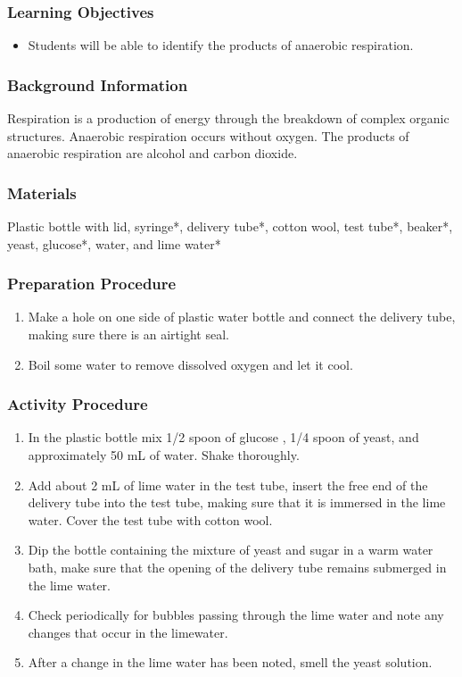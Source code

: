 \subsubsection*{Learning Objectives}
\begin{itemize}
\item{Students will be able to identify the products of anaerobic respiration.}
\end{itemize}

\subsubsection*{Background Information}
Respiration is a production of energy through the breakdown of complex organic structures. Anaerobic respiration occurs without oxygen. The products of anaerobic respiration are alcohol and carbon dioxide.

\subsubsection*{Materials}
Plastic bottle with lid, syringe*, delivery tube*, cotton wool, test tube*, beaker*, yeast, glucose*, water, and lime water*

\subsubsection*{Preparation Procedure}
\begin{enumerate}
\item{Make a hole on one side of plastic water bottle and connect the delivery tube, making sure there is an airtight seal.}
\item{Boil some water to remove dissolved oxygen and let it cool.}
\end{enumerate}

\subsubsection*{Activity Procedure}
\begin{enumerate}
\item{In the plastic bottle mix 1/2 spoon of glucose , 1/4 spoon of yeast, and approximately 50 mL of water. Shake thoroughly.}
\item{Add about 2 mL of lime water in the test tube, insert the free end of the delivery tube into the test tube, making sure that it is immersed in the lime water. Cover the test tube with cotton wool.}
\item{Dip the bottle containing the mixture of yeast and sugar in a warm water bath, make sure that the opening of the delivery tube remains submerged in the lime water.}
\item{Check periodically for bubbles passing through the lime water and note any changes that occur in the limewater.}
\item{After a change in the lime water has been noted, smell the yeast solution.}
\end{enumerate}

